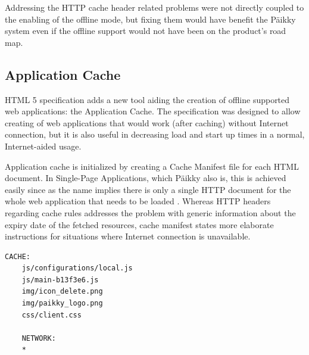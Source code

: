 Addressing the HTTP cache header related problems were not directly coupled to the enabling of the offline mode, but fixing them would have benefit the Päikky system even if the offline support would not have been on the product's road map.







\subsection{Application Cache}
\label{subsec:appcache}


HTML 5 specification adds a new tool aiding the creation of offline supported web applications: the Application Cache. The specification was designed to allow creating of web applications that would work (after caching) without Internet connection, but it is also useful in decreasing load and start up times in a normal, Internet-aided usage. 

Application cache is initialized by creating a Cache Manifest file for each HTML document. In Single-Page Applications, which Päikky also is, this is achieved easily since as the name implies there is only a single HTTP document for the whole web application that needs to be loaded \cite{_html_????}.  Whereas HTTP headers regarding cache rules addresses the problem with generic information about the expiry date of the fetched resources, cache manifest states more elaborate instructions for situations where Internet connection is unavailable. \cite{qian_web_2012}

\newpage

\begin{lstlisting}[caption={Snippet of Päikky's Cache Manifest},label={lst:manifest}]
    CACHE:
    js/configurations/local.js
    js/main-b13f3e6.js
    img/icon_delete.png
    img/paikky_logo.png
    css/client.css

    NETWORK:
    *
\end{lstlisting} %

